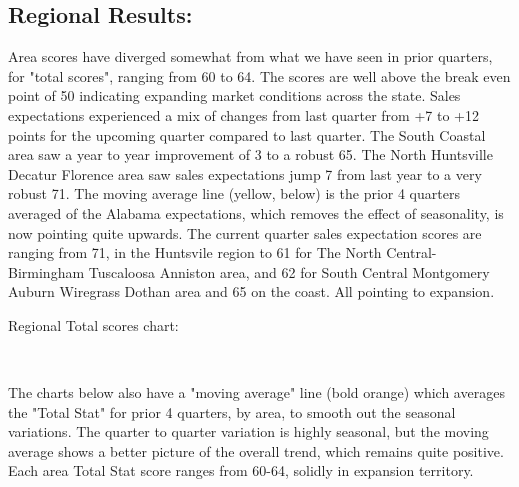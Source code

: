 \documentclass[11pt]{article}
\begin{document}
    \subsection{Regional Results:}\label{regional-results}
Area scores have diverged somewhat from what we have seen in prior quarters, for "total scores", ranging from 60 to 64. The scores are well above the break even point of 50 indicating expanding market conditions across the state. Sales expectations experienced a mix of changes from last quarter from +7 to +12 points for the upcoming quarter compared to last quarter.  The South Coastal area  saw a year to year improvement of 3 to a robust 65. The North Huntsville Decatur Florence area saw sales expectations jump 7 from last year to a very robust 71. The moving average line (yellow, below) is the prior 4 quarters averaged of the Alabama expectations, which removes the effect of seasonality, is now pointing quite upwards. The current quarter sales expectation scores are ranging from 71, in the Huntsvile region to 61 for The North Central-Birmingham Tuscaloosa Anniston area, and 62 for South Central Montgomery Auburn Wiregrass Dothan area and 65 on the coast. All pointing to expansion.  \newline
\newline
\newline

\pagebreak
Regional Total scores chart:

    \begin{center}
    \end{center}
    { \hspace*{\fill} \\}
    
    The charts below also have a "moving average" line (bold orange) which
averages the "Total Stat" for prior 4 quarters, by area, to smooth out
the seasonal variations. The quarter to quarter variation is highly
seasonal, but the moving average shows a better picture of the overall
trend, which remains quite positive. Each area Total Stat score ranges
from 60-64, solidly in expansion territory.


    \begin{center}
    \end{center}
    { \hspace*{\fill} \\}
    
\end{document}
